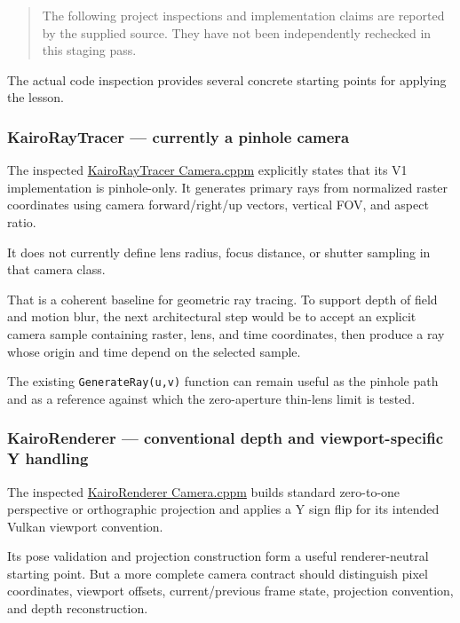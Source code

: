 \begin{quote}
The following project inspections and implementation claims are reported by the supplied source. They have not been independently rechecked in this staging pass.
\end{quote}

The actual code inspection provides several concrete starting points for applying the lesson.

\subsubsection{KairoRayTracer --- currently a pinhole camera}\label{kairoraytracer-currently-a-pinhole-camera}

The inspected \href{https://github.com/swayam8624/KairoRayTracer/blob/main/Camera.cppm?utm_source=chatgpt.com}{KairoRayTracer Camera.cppm} explicitly states that its V1 implementation is pinhole-only. It generates primary rays from normalized raster coordinates using camera forward/right/up vectors, vertical FOV, and aspect ratio.

It does not currently define lens radius, focus distance, or shutter sampling in that camera class.

That is a coherent baseline for geometric ray tracing. To support depth of field and motion blur, the next architectural step would be to accept an explicit camera sample containing raster, lens, and time coordinates, then produce a ray whose origin and time depend on the selected sample.

The existing \texttt{GenerateRay(u,v)} function can remain useful as the pinhole path and as a reference against which the zero-aperture thin-lens limit is tested.

\subsubsection{KairoRenderer --- conventional depth and viewport-specific Y handling}\label{kairorenderer-conventional-depth-and-viewport-specific-y-handling}

The inspected \href{https://github.com/swayam8624/KairoRenderer/blob/main/Camera.cppm?utm_source=chatgpt.com}{KairoRenderer Camera.cppm} builds standard zero-to-one perspective or orthographic projection and applies a Y sign flip for its intended Vulkan viewport convention.

Its pose validation and projection construction form a useful renderer-neutral starting point. But a more complete camera contract should distinguish pixel coordinates, viewport offsets, current/previous frame state, projection convention, and depth reconstruction.

